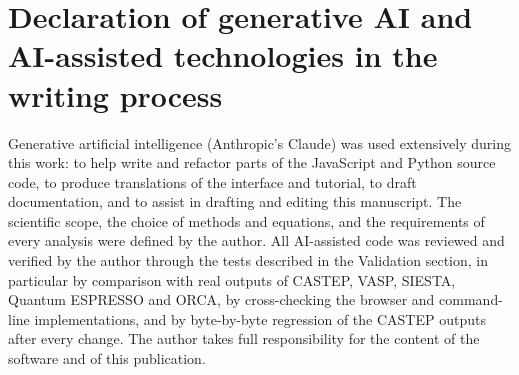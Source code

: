 \documentclass[preprint,review,12pt]{elsarticle}%
\def\BMRbibstyle{elsarticle-num}%
\begin{document}
\begin{frontmatter}


\begin{abstract}

\end{abstract}
\begin{highlights}

\end{highlights}
\begin{keyword}

\end{keyword}
\end{frontmatter}

\linenumbers
















\section*{Declaration of generative AI and AI-assisted technologies in the writing process}
Generative artificial intelligence (Anthropic's Claude) was used extensively during this work: to help write and refactor parts of the JavaScript and Python source code, to produce translations of the interface and tutorial, to draft documentation, and to assist in drafting and editing this manuscript. The scientific scope, the choice of methods and equations, and the requirements of every analysis were defined by the author. All AI-assisted code was reviewed and verified by the author through the tests described in the Validation section, in particular by comparison with real outputs of CASTEP, VASP, SIESTA, Quantum ESPRESSO and ORCA, by cross-checking the browser and command-line implementations, and by byte-by-byte regression of the CASTEP outputs after every change. The author takes full responsibility for the content of the software and of this publication.


\appendix




\end{document}
